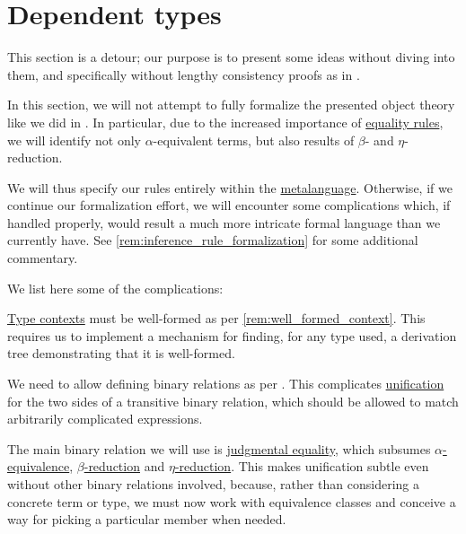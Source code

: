 \section{Dependent types}\label{sec:dependent_types}

This section is a detour; our purpose is to present some ideas without diving into them, and specifically without lengthy consistency proofs as in .

\begin{remark}\label{rem:dependent_type_rule_formalization}
  In this section, we will not attempt to fully formalize the presented object theory like we did in . In particular, due to the increased importance of \hyperref[rem:type_theory_rule_classification/equality]{equality rules}, we will identify not only \( \alpha \)-equivalent terms, but also results of \( \beta \)- and \( \eta \)-reduction.

  We will thus specify our rules entirely within the \hyperref[con:metalanguage]{metalanguage}. Otherwise, if we continue our formalization effort, we will encounter some complications which, if handled properly, would result a much more intricate formal language than we currently have. See \cref{rem:inference_rule_formalization} for some additional commentary.

  We list here some of the complications:
  \begin{thmenum}
     \hyperref[def:type_context]{Type contexts} must be well-formed as per \cref{rem:well_formed_context}. This requires us to implement a mechanism for finding, for any type used, a derivation tree demonstrating that it is well-formed.

     We need to allow defining binary relations as per . This complicates \hyperref[con:unification]{unification} for the two sides of a transitive binary relation, which should be allowed to match arbitrarily complicated expressions.

     The main binary relation we will use is \hyperref[con:equality]{judgmental equality}, which subsumes \hyperref[def:lambda_term_alpha_equivalence]{\( \alpha \)-equivalence}, \hyperref[def:typed_term_reduction]{\( \beta \)-reduction} and \hyperref[def:typed_term_reduction]{\( \eta \)-reduction}. This makes unification subtle even without other binary relations involved, because, rather than considering a concrete term or type, we must now work with equivalence classes and conceive a way for picking a particular member when needed.


\end{thmenum}
\end{remark}
